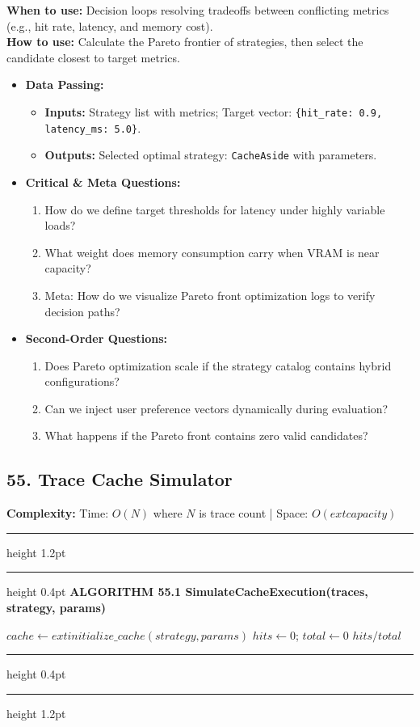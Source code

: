 \documentclass[11pt,a4paper]{article}
\newenvironment{textbookalgo}[2]{%
  \par\addvspace{1.2em}\noindent
  \hrule height 1.2pt
  \vspace{1.5pt}
  \hrule height 0.4pt
  \vspace{5pt}
  {\noindent\large\bfseries\sffamily ALGORITHM #1 \quad #2}
  \par\vspace{5pt}
  \RestyleAlgo{plain}
}{%
  \par\vspace{4pt}
  \hrule height 0.4pt
  \vspace{1.5pt}
  \hrule height 1.2pt
  \par\addvspace{1.2em}
}
\theoremstyle{definition}
\begin{document}
\noindent
\textbf{When to use:} Decision loops resolving tradeoffs between conflicting metrics (e.g., hit rate, latency, and memory cost).\\
\textbf{How to use:} Calculate the Pareto frontier of strategies, then select the candidate closest to target metrics.
\begin{itemize}[leftmargin=*]
  \item[] \textbf{Data Passing:}
    \begin{itemize}
      \item \textbf{Inputs:} Strategy list with metrics; Target vector: \texttt{\{hit\_rate: 0.9, latency\_ms: 5.0\}}.
      \item \textbf{Outputs:} Selected optimal strategy: \texttt{CacheAside} with parameters.
    \end{itemize}
  \item[] \textbf{Critical \& Meta Questions:}
  \begin{enumerate}
    \item How do we define target thresholds for latency under highly variable loads?
    \item What weight does memory consumption carry when VRAM is near capacity?
    \item Meta: How do we visualize Pareto front optimization logs to verify decision paths?
  \end{enumerate}
  \item[] \textbf{Second-Order Questions:}
  \begin{enumerate}
    \item Does Pareto optimization scale if the strategy catalog contains hybrid configurations?
    \item Can we inject user preference vectors dynamically during evaluation?
    \item What happens if the Pareto front contains zero valid candidates?
  \end{enumerate}
\end{itemize}
\medskip

\clearpage
\subsection{55. Trace Cache Simulator}


\noindent
\textbf{Complexity:} Time: $O(N)$ where $N$ is trace count | Space: $O(	ext{capacity})$
\smallskip

\begin{textbookalgo}{55.1}{SimulateCacheExecution(traces, strategy, params)}
\begin{algorithm}[H]
$cache \leftarrow 	ext{initialize\_cache}(strategy, params)$\;
$hits \leftarrow 0$; $total \leftarrow 0$\;
\Return $hits / total$\;
\end{algorithm}
\end{textbookalgo}
\end{document}
